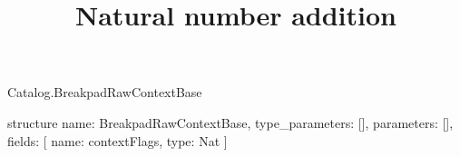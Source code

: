\begin{lexlean}{Catalog.BreakpadRawContextBase}
\title{Natural number addition}
\begin{semanticmodule}
structure{
  name: BreakpadRawContextBase,
  type_parameters: [],
  parameters: [],
  fields: [
    {name: contextFlags, type: Nat}
  ]
}
\end{semanticmodule}
\end{lexlean}
